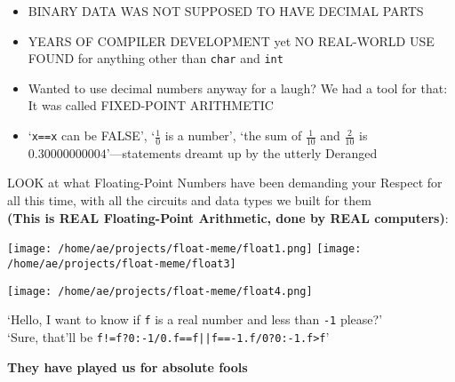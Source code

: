 \documentclass[a4paper, 12pt, final]{article}
\begin{document}
%

\large\centering


\def\DOT{\fontsize{30pt}{30pt}\selectfont\raisebox{-6pt}{•}\kern-2pt}
\begin{itemize}
\item[\DOT] BINARY DATA WAS NOT SUPPOSED TO HAVE DECIMAL PARTS
\item[\DOT] YEARS OF COMPILER DEVELOPMENT yet NO REAL-WORLD USE FOUND for anything other than \texttt{char} and \texttt{int}
\item[\DOT] Wanted to use decimal numbers anyway for a laugh? We had a tool for that: It was called FIXED-POINT ARITHMETIC
\item[\DOT] ‘\texttt{x==x} can be FALSE’, ‘$\frac1 0$ is a number’, ‘the sum of $\frac1{10}$
and $\frac2{10}$ is\\$0.30000000004$’—statements dreamt up by the utterly Deranged
\end{itemize}

\noindent
LOOK at what Floating-Point Numbers have been demanding your Respect for all this time,
with all the circuits and data types we built for them\\
\textbf{(This is REAL Floating-Point Arithmetic, done by REAL computers)}:\medskip

\texttt{[image: /home/ae/projects/float-meme/float1.png]}
\texttt{[image: /home/ae/projects/float-meme/float3]}\smallskip

\texttt{[image: /home/ae/projects/float-meme/float4.png]}\bigskip

\noindent ‘Hello, I want to know if \texttt{f} is a real number and less than \texttt{-1} please?’\\
‘Sure, that’ll be \texttt{f!=f?0:-1/0.f==f||f==-1.f/0?0:-1.f>f}’\medskip

\noindent
\textbf{They have played us for absolute fools}
\end{document}
